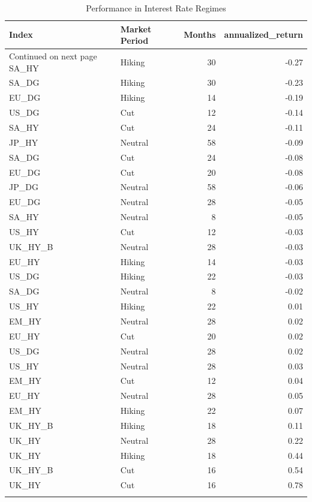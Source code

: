 \documentclass[11pt,preprint, authoryear]{elsarticle}
\numberwithin{equation}{section}
\numberwithin{figure}{section}
\numberwithin{table}{section}
\begin{document}
\begingroup\fontsize{12pt}{13pt}\selectfont
\begin{longtable}{llrr}
  \toprule
Index & Market Period & Months & annualized\_return \\ 
  \hline 
\endhead 
\hline 
{\footnotesize Continued on next page} 
\endfoot 
\endlastfoot 
 \midrule
SA\_HY & Hiking &  30 & -0.27 \\ 
  SA\_DG & Hiking &  30 & -0.23 \\ 
  EU\_DG & Hiking &  14 & -0.19 \\ 
  US\_DG & Cut &  12 & -0.14 \\ 
  SA\_HY & Cut &  24 & -0.11 \\ 
  JP\_HY & Neutral &  58 & -0.09 \\ 
  SA\_DG & Cut &  24 & -0.08 \\ 
  EU\_DG & Cut &  20 & -0.08 \\ 
  JP\_DG & Neutral &  58 & -0.06 \\ 
  EU\_DG & Neutral &  28 & -0.05 \\ 
  SA\_HY & Neutral &   8 & -0.05 \\ 
  US\_HY & Cut &  12 & -0.03 \\ 
  UK\_HY\_B & Neutral &  28 & -0.03 \\ 
  EU\_HY & Hiking &  14 & -0.03 \\ 
  US\_DG & Hiking &  22 & -0.03 \\ 
  SA\_DG & Neutral &   8 & -0.02 \\ 
  US\_HY & Hiking &  22 & 0.01 \\ 
  EM\_HY & Neutral &  28 & 0.02 \\ 
  EU\_HY & Cut &  20 & 0.02 \\ 
  US\_DG & Neutral &  28 & 0.02 \\ 
  US\_HY & Neutral &  28 & 0.03 \\ 
  EM\_HY & Cut &  12 & 0.04 \\ 
  EU\_HY & Neutral &  28 & 0.05 \\ 
  EM\_HY & Hiking &  22 & 0.07 \\ 
  UK\_HY\_B & Hiking &  18 & 0.11 \\ 
  UK\_HY & Neutral &  28 & 0.22 \\ 
  UK\_HY & Hiking &  18 & 0.44 \\ 
  UK\_HY\_B & Cut &  16 & 0.54 \\ 
  UK\_HY & Cut &  16 & 0.78 \\ 
   \bottomrule
\caption{Performance in Interest Rate Regimes\label{tab3}} 
\end{longtable}
\endgroup
\end{document}
